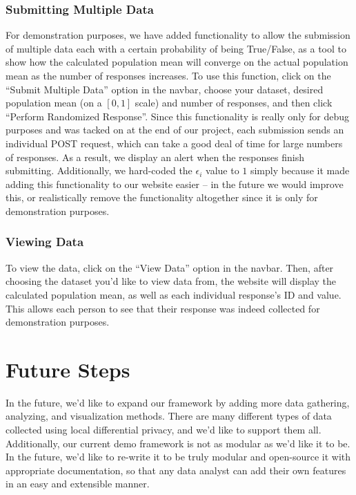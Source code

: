 \documentclass[12pt]{article}
\theoremstyle{definition}
\begin{document}
\subsubsection{Submitting Multiple Data}

\noindent

For demonstration purposes, we have added functionality to allow the submission of multiple data each with a certain probability of being True/False, as a tool to show how the calculated population mean will converge on the actual population mean as the number of responses increases. To use this function, click on the ``Submit Multiple Data'' option in the navbar, choose your dataset, desired population mean (on a $[0, 1]$ scale) and number of responses, and then click ``Perform Randomized Response''. Since this functionality is really only for debug purposes and was tacked on at the end of our project, each submission sends an individual POST request, which can take a good deal of time for large numbers of responses. As a result, we display an alert when the responses finish submitting. Additionally, we hard-coded the $\epsilon_i$ value to $1$ simply because it made adding this functionality to our website easier -- in the future we would improve this, or realistically remove the functionality altogether since it is only for demonstration purposes. 

\subsubsection{Viewing Data}

\noindent

To view the data, click on the ``View Data'' option in the navbar. Then, after choosing the dataset you'd like to view data from, the website will display the calculated population mean, as well as each individual response's ID and value. This allows each person to see that their response was indeed collected for demonstration purposes.

\section{Future Steps}

\noindent

In the future, we'd like to expand our framework by adding more data gathering, analyzing, and visualization methods. There are many different types of data collected using local differential privacy, and we'd like to support them all. Additionally, our current demo framework is not as modular as we'd like it to be. In the future, we'd like to re-write it to be truly modular and open-source it with appropriate documentation, so that any data analyst can add their own features in an easy and extensible manner.
\end{document}
